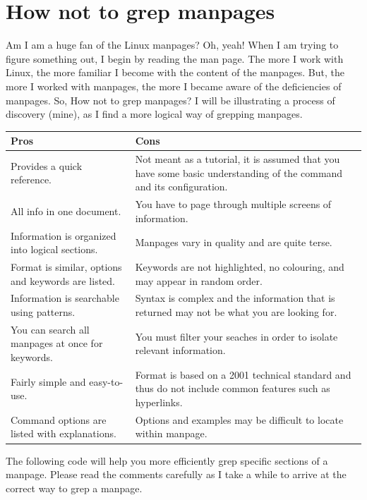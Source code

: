 \section{How not to grep manpages}

Am I am a huge fan of the Linux manpages? Oh, yeah! When I am trying to figure something out, I begin by reading the man page. The more I work with Linux, the more familiar I become with the content of the manpages. But, the more I worked with manpages, the more I became aware of the deficiencies of manpages. So, How not to grep manpages? I will be illustrating a process of discovery (mine), as I find a more logical way of grepping manpages.

\begin{tabularx}{\linewidth}{X | X} %
\caption{Manpages}\label{table:manpages-comparison}\\ %
\toprule
Pros & Cons \\%
\midrule
Provides a quick reference. & Not meant as a tutorial, it is assumed that you have some basic understanding of the command and its configuration.\\[2mm]
All info in one document. & You have to page through multiple screens of information.\\[2mm]
Information is organized into logical sections. & Manpages vary in quality and are quite terse.\\[2mm]
Format is similar, options and keywords are listed. & Keywords are not highlighted, no colouring, and may appear in random order.\\[2mm]
Information is searchable using patterns. & Syntax is complex and the information that is returned may not be what you are looking for.\\[2mm]
You can search all manpages at once for keywords. & You must filter your seaches in order to isolate relevant information.\\[2mm]
Fairly simple and easy-to-use. & Format is based on a 2001 technical standard and thus do not include common features such as hyperlinks.\\[2mm]
Command options are listed with explanations. & Options and examples may be difficult to locate within manpage.\\[2mm]
\bottomrule
\end{tabularx}

The following code will help you more efficiently grep specific sections of a manpage. Please read the comments carefully as I take a while to arrive at the correct way to grep a manpage.

